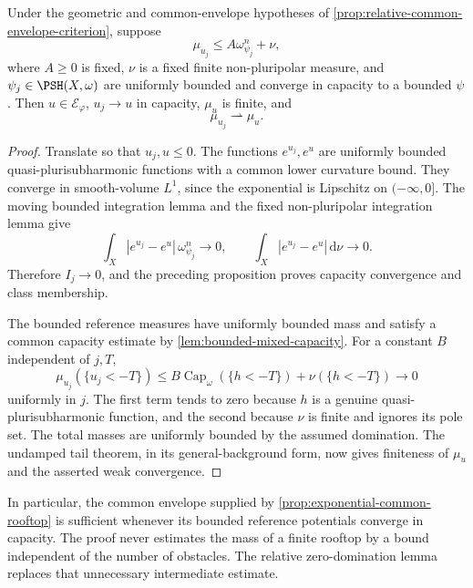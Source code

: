\begin{theorem}\label{thm:relative-moving-measure-continuity}
Under the geometric and common-envelope hypotheses of \cref{prop:relative-common-envelope-criterion}, suppose
\[
 \mu_{u_j}\leq A\omega_{\psi_j}^n+\nu,
\]
where $A\geq0$ is fixed, $\nu$ is a fixed finite non-pluripolar measure, and $\psi_j\in\PSH(X,\omega)$ are uniformly bounded and converge in capacity to a bounded $\psi$. Then $u\in\mathcal E_\varphi$, $u_j\to u$ in capacity, $\mu_u$ is finite, and
\[
 \mu_{u_j}\rightharpoonup\mu_u.
\]
\end{theorem}
\begin{proof}
Translate so that $u_j,u\leq0$. The functions $e^{u_j},e^u$ are uniformly bounded quasi-plurisubharmonic functions with a common lower curvature bound. They converge in smooth-volume $L^1$, since the exponential is Lipschitz on $(-\infty,0]$. The moving bounded integration lemma and the fixed non-pluripolar integration lemma give
\[
 \int_X|e^{u_j}-e^u|\,\omega_{\psi_j}^n\longrightarrow0,
 \qquad
 \int_X|e^{u_j}-e^u|\,\mathrm{d}\nu\longrightarrow0.
\]
Therefore $I_j\to0$, and the preceding proposition proves capacity convergence and class membership.

The bounded reference measures have uniformly bounded mass and satisfy a common capacity estimate by \cref{lem:bounded-mixed-capacity}. For a constant $B$ independent of $j,T$,
\[
 \mu_{u_j}(\{u_j<-T\})
 \leq B\operatorname{Cap}_\omega(\{h<-T\})
       +\nu(\{h<-T\})\longrightarrow0
\]
uniformly in $j$. The first term tends to zero because $h$ is a genuine quasi-plurisubharmonic function, and the second because $\nu$ is finite and ignores its pole set. The total masses are uniformly bounded by the assumed domination. The undamped tail theorem, in its general-background form, now gives finiteness of $\mu_u$ and the asserted weak convergence.
\end{proof}

In particular, the common envelope supplied by \cref{prop:exponential-common-rooftop} is sufficient whenever its bounded reference potentials converge in capacity. The proof never estimates the mass of a finite rooftop by a bound independent of the number of obstacles. The relative zero-domination lemma replaces that unnecessary intermediate estimate.
